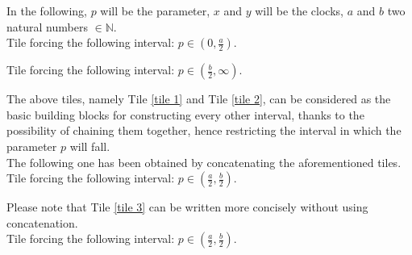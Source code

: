 \documentclass[12pt, a4paper]{article}
\begin{document}

\noindent
In the following, $p$ will be the parameter, $x$ and $y$ will be the clocks, $a$ and $b$ two natural numbers $\in \mathbb{N}$.\\

Tile forcing the following interval: $p \in (0, \frac{a}{2})$.



\bigskip

Tile forcing the following interval: $p \in (\frac{b}{2}, \infty)$.



\noindent
The above tiles, namely Tile \ref{tile 1} and Tile \ref{tile 2}, can be considered as the basic building blocks for constructing every other interval, thanks to the possibility of chaining them together, hence restricting the interval in which the parameter $p$ will fall.\\

\noindent
The following one has been obtained by concatenating the aforementioned tiles.\\

Tile forcing the following interval: $p \in (\frac{a}{2}, \frac{b}{2})$.



\noindent
Please note that Tile \ref{tile 3} can be written more concisely without using concatenation.\\

Tile forcing the following interval: $p \in (\frac{a}{2}, \frac{b}{2})$.


\end{document}
